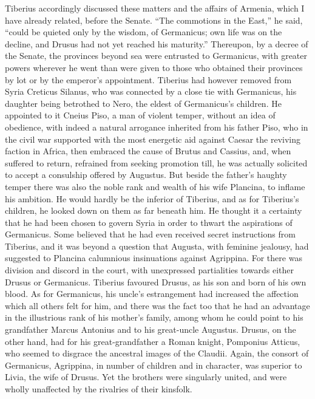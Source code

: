 Tiberius accordingly discussed these matters and the affairs of Armenia, which I have already related, before the Senate. ``The commotions in the East,'' he said, ``could be quieted only by the wisdom, of Germanicus; own life was on the decline, and Drusus had not yet reached his maturity.'' Thereupon, by a decree of the Senate, the provinces beyond sea were entrusted to Germanicus, with greater powers wherever he went than were given to those who obtained their provinces by lot or by the emperor's appointment. Tiberius had however removed from Syria Creticus Silanus, who was connected by a close tie with Germanicus, his daughter being betrothed to Nero, the eldest of Germanicus's children. He appointed to it Cneius Piso, a man of violent temper, without an idea of obedience, with indeed a natural arrogance inherited from his father Piso, who in the civil war supported with the most energetic aid against Caesar the reviving faction in Africa, then embraced the cause of Brutus and Cassius, and, when suffered to return, refrained from seeking promotion till, he was actually solicited to accept a consulship offered by Augustus. But beside the father's haughty temper there was also the noble rank and wealth of his wife Plancina, to inflame his ambition. He would hardly be the inferior of Tiberius, and as for Tiberius's children, he looked down on them as far beneath him. He thought it a certainty that he had been chosen to govern Syria in order to thwart the aspirations of Germanicus. Some believed that he had even received secret instructions from Tiberius, and it was beyond a question that Augusta, with feminine jealousy, had suggested to Plancina calumnious insinuations against Agrippina. For there was division and discord in the court, with unexpressed partialities towards either Drusus or Germanicus. Tiberius favoured Drusus, as his son and born of his own blood. As for Germanicus, his uncle's estrangement had increased the affection which all others felt for him, and there was the fact too that he had an advantage in the illustrious rank of his mother's family, among whom he could point to his grandfather Marcus Antonius and to his great-uncle Augustus. Drusus, on the other hand, had for his great-grandfather a Roman knight, Pomponius Atticus, who seemed to disgrace the ancestral images of the Claudii. Again, the consort of Germanicus, Agrippina, in number of children and in character, was superior to Livia, the wife of Drusus. Yet the brothers were singularly united, and were wholly unaffected by the rivalries of their kinsfolk.

